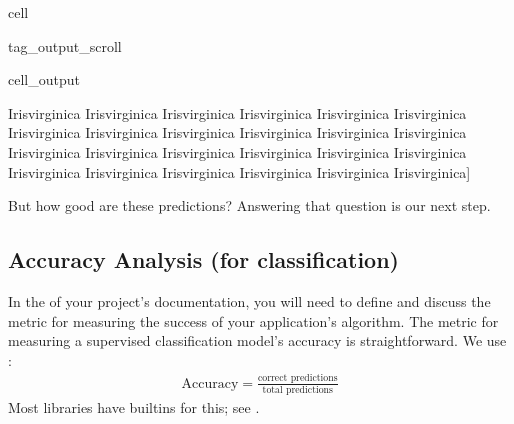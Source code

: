 \documentclass[letterpaper,10pt,english]{jupyterBook}
\begin{document}
\begin{sphinxuseclass}{cell}
\begin{sphinxuseclass}{tag_output_scroll}
\begin{sphinxVerbatimOutput}
\begin{sphinxuseclass}{cell_output}
\begin{sphinxVerbatim}[commandchars=\\\{\}]
 \PYGZsq{}Iris\PYGZhy{}virginica\PYGZsq{} \PYGZsq{}Iris\PYGZhy{}virginica\PYGZsq{} \PYGZsq{}Iris\PYGZhy{}virginica\PYGZsq{} \PYGZsq{}Iris\PYGZhy{}virginica\PYGZsq{}
 \PYGZsq{}Iris\PYGZhy{}virginica\PYGZsq{} \PYGZsq{}Iris\PYGZhy{}virginica\PYGZsq{} \PYGZsq{}Iris\PYGZhy{}virginica\PYGZsq{} \PYGZsq{}Iris\PYGZhy{}virginica\PYGZsq{}
 \PYGZsq{}Iris\PYGZhy{}virginica\PYGZsq{} \PYGZsq{}Iris\PYGZhy{}virginica\PYGZsq{} \PYGZsq{}Iris\PYGZhy{}virginica\PYGZsq{} \PYGZsq{}Iris\PYGZhy{}virginica\PYGZsq{}
 \PYGZsq{}Iris\PYGZhy{}virginica\PYGZsq{} \PYGZsq{}Iris\PYGZhy{}virginica\PYGZsq{} \PYGZsq{}Iris\PYGZhy{}virginica\PYGZsq{} \PYGZsq{}Iris\PYGZhy{}virginica\PYGZsq{}
 \PYGZsq{}Iris\PYGZhy{}virginica\PYGZsq{} \PYGZsq{}Iris\PYGZhy{}virginica\PYGZsq{} \PYGZsq{}Iris\PYGZhy{}virginica\PYGZsq{} \PYGZsq{}Iris\PYGZhy{}virginica\PYGZsq{}
 \PYGZsq{}Iris\PYGZhy{}virginica\PYGZsq{} \PYGZsq{}Iris\PYGZhy{}virginica\PYGZsq{} \PYGZsq{}Iris\PYGZhy{}virginica\PYGZsq{} \PYGZsq{}Iris\PYGZhy{}virginica\PYGZsq{}]
\end{sphinxVerbatim}

\end{sphinxuseclass}\end{sphinxVerbatimOutput}

\end{sphinxuseclass}
\end{sphinxuseclass}
\sphinxAtStartPar
But how good are these predictions? Answering that question is our next step.

\sphinxstepscope


\subsection{Accuracy Analysis (for classification)}
\label{\detokenize{task2_c/example_sup_class/sup_class_ex-accuracy:accuracy-analysis-for-classification}}\label{\detokenize{task2_c/example_sup_class/sup_class_ex-accuracy:sup-class-ex-accuracy}}\label{\detokenize{task2_c/example_sup_class/sup_class_ex-accuracy::doc}}
\sphinxAtStartPar
In the  of your project’s documentation, you will need to define and discuss the metric for measuring the success of your application’s algorithm.  The metric for measuring a supervised classification model’s accuracy is straightforward. We use :
\begin{equation*}
\begin{split}\text{Accuracy}=\frac{\text{correct predictions}}{\text{total predictions}}\end{split}
\end{equation*}
\sphinxAtStartPar
Most libraries have builtins for this; see .
\end{document}
